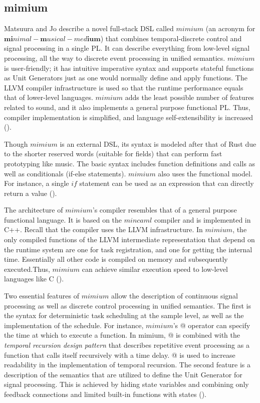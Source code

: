 \documentclass{report}
\newcommand\citeparen[1]{(\cite{#1})}
\begin{document}
\subsection{mimium}

Matsuura and  Jo  describe a  novel full-stack DSL called  $mimium$ (an acronym for $\textbf{mi}nimal-\textbf{m}usical-med\textbf{ium}$) that  combines temporal-discrete control  and signal processing in a  single  PL. It  can describe everything from low-level signal processing, all the way to discrete  event processing  in unified semantics. $mimium$ is  user-friendly;  it has  intuitive  imperative  syntax and supports stateful functions as  Unit  Generators just  as one  would  normally define  and apply functions. The  LLVM compiler infrastructure is used so that the runtime performance equals  that of lower-level languages. $mimium$ adds the least possible  number of features related  to sound, and  it also implements a general purpose  functional PL. Thus, compiler implementation is simplified, and language self-extensibility is increased \citeparen{matsuura_jo_2021}.

Though $mimium$ is an external DSL, its syntax  is modeled  after that of  Rust  due  to  the shorter reserved words (suitable for fields) that can perform fast prototyping  like  music. The  basic syntax  includes function definitions and calls as well as  conditionals (if-else statements). $mimium$ also uses the functional model. For instance, a single  $if$ statement can be  used as an expression that can  directly  return  a value \citeparen{matsuura_jo_2021}.

The architecture of  $mimium$'s  compiler resembles that of a general purpose  functional language. It is based  on the $mincaml$ compiler and  is  implemented  in C++. Recall  that the  compiler uses the LLVM infrastructure. In $mimium$, the only compiled functions of the LLVM intermediate representation that depend on  the runtime system are one for task registration, and one for getting the internal time. Essentially all other code is compiled  on memory and subsequently  executed.Thus,  $mimium$ can achieve similar execution speed to low-level  languages  like C \citeparen{matsuura_jo_2021}.

Two essential features of $mimium$  allow the description of continuous  signal processing as well as discrete control processing in unified semantics. The first is the syntax for deterministic task scheduling  at the sample level, as well as  the implementation of the schedule. For instance, $mimium$'s  @ operator  can specify the time at which to execute a  function. In mimium, @ is combined with the \textit{temporal recursion design pattern} that describes repetitive event processing as a function that calls itself recursively with a time delay. @ is used to increase readability in the implementation of temporal recursion.  The second feature is a  description of the semantics that are utilized to define the Unit Generator for signal processing.  This is achieved  by hiding state  variables   and   combining only feedback connections  and limited built-in functions  with states \citeparen{matsuura_jo_2021}.
\end{document}
